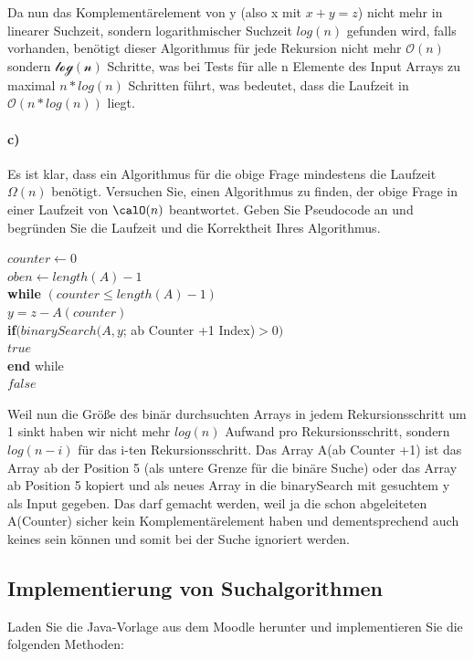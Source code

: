 \documentclass[paper=a4, fontsize=11pt]{scrartcl}
\numberwithin{equation}{section}
\numberwithin{figure}{section}
\numberwithin{table}{section}
\begin{document}
Da nun das Komplementärelement von y (also x mit $x+y=z$) nicht mehr in linearer Suchzeit, sondern logarithmischer Suchzeit $log(n)$ gefunden wird, falls vorhanden, benötigt dieser Algorithmus für jede Rekursion nicht mehr $\mathcal{O}(n)$ sondern $\mathcal{log(n)}$ Schritte, was bei Tests für alle n Elemente des Input Arrays zu maximal $n*log(n)$ Schritten führt, was bedeutet, dass die Laufzeit in $\mathcal{O}(n*log(n))$ liegt.

\paragraph{c)}
Es ist klar, dass ein Algorithmus für die obige Frage mindestens die Laufzeit $\Omega(n)$ benötigt. Versuchen Sie, einen Algorithmus zu finden, der obige Frage in einer Laufzeit von $\calO(n)$ beantwortet. Geben Sie Pseudocode an und begründen Sie die Laufzeit und die Korrektheit Ihres Algorithmus. \\

\begin{algorithm}[H]
\SetAlgoLined
{}
$counter \leftarrow 0$\\
$oben \leftarrow length(A)-1$\\
\textbf{while} $(counter \leq length(A)-1)$ \\
$y=z-A(counter)$ \\
\textbf{if}$(binarySearch(A ,y $; ab Counter +1 Index)$ > 0)$ \\
\Return $true$ \\
\textbf{end} while \\
\Return $false$ \\
\end{algorithm}

Weil nun die Größe des binär durchsuchten Arrays in jedem Rekursionsschritt um 1 sinkt haben wir nicht mehr $log(n)$ Aufwand pro Rekursionsschritt, sondern $log(n-i)$ für das i-ten Rekursionsschritt. Das Array A(ab Counter +1) ist das Array ab der Position 5 (als untere Grenze für die binäre Suche) oder das Array ab Position 5 kopiert und als neues Array in die binarySearch mit gesuchtem y als Input gegeben. Das darf gemacht werden, weil ja die schon abgeleiteten A(Counter) sicher kein Komplementärelement haben und dementsprechend auch keines sein können und somit bei der Suche ignoriert werden.

\subsection{Implementierung von Suchalgorithmen}
Laden Sie die Java-Vorlage aus dem Moodle herunter und implementieren Sie die folgenden Methoden:
\end{document}
